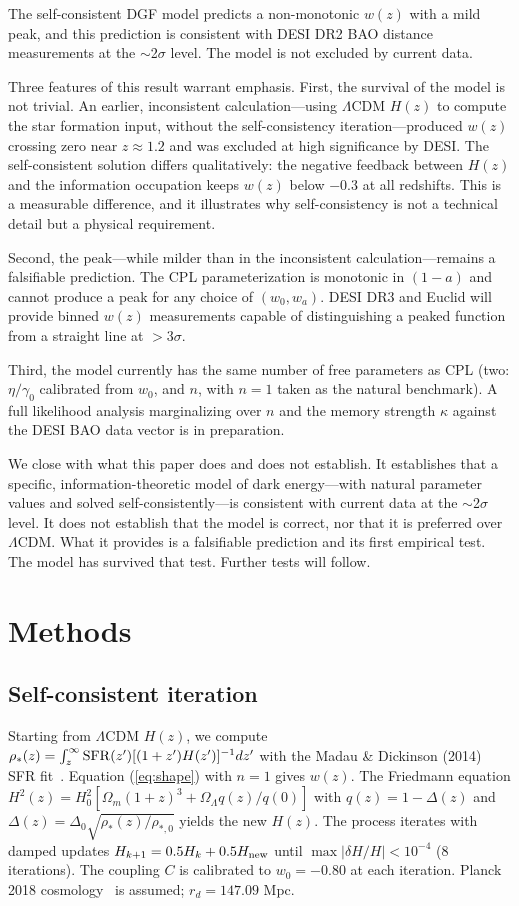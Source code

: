 \documentclass[12pt,a4paper]{article}
\begin{document}
The self-consistent DGF model predicts a non-monotonic $w(z)$ with a mild peak, and this prediction is consistent with DESI DR2 BAO distance measurements at the $\sim$2$\sigma$ level. The model is not excluded by current data.

Three features of this result warrant emphasis. First, the survival of the model is not trivial. An earlier, inconsistent calculation---using $\Lambda$CDM $H(z)$ to compute the star formation input, without the self-consistency iteration---produced $w(z)$ crossing zero near $z\approx1.2$ and was excluded at high significance by DESI. The self-consistent solution differs qualitatively: the negative feedback between $H(z)$ and the information occupation keeps $w(z)$ below $-0.3$ at all redshifts. This is a measurable difference, and it illustrates why self-consistency is not a technical detail but a physical requirement.

Second, the peak---while milder than in the inconsistent calculation---remains a falsifiable prediction. The CPL parameterization is monotonic in $(1-a)$ and cannot produce a peak for any choice of $(w_0,w_a)$. DESI DR3 and Euclid will provide binned $w(z)$ measurements capable of distinguishing a peaked function from a straight line at $>$3$\sigma$.

Third, the model currently has the same number of free parameters as CPL (two: $\eta/\gamma_0$ calibrated from $w_0$, and $n$, with $n=1$ taken as the natural benchmark). A full likelihood analysis marginalizing over $n$ and the memory strength $\kappa$ against the DESI BAO data vector is in preparation.

We close with what this paper does and does not establish. It establishes that a specific, information-theoretic model of dark energy---with natural parameter values and solved self-consistently---is consistent with current data at the $\sim$2$\sigma$ level. It does not establish that the model is correct, nor that it is preferred over $\Lambda$CDM. What it provides is a falsifiable prediction and its first empirical test. The model has survived that test. Further tests will follow.

\section*{Methods}

\subsection*{Self-consistent iteration}
Starting from $\Lambda$CDM $H(z)$, we compute $\rho_*(z)=\int_z^\infty{\rm SFR}(z')[(1+z')H(z')]^{-1}dz'$ with the Madau \& Dickinson (2014) SFR fit~\cite{madau2014}. Equation (\ref{eq:shape}) with $n=1$ gives $w(z)$. The Friedmann equation $H^2(z)=H_0^2[\Omega_m(1+z)^3+\Omega_\Lambda q(z)/q(0)]$ with $q(z)=1-\Delta(z)$ and $\Delta(z)=\Delta_0\sqrt{\rho_*(z)/\rho_{*,0}}$ yields the new $H(z)$. The process iterates with damped updates $H_{k+1}=0.5H_k+0.5H_{\rm new}$ until $\max|\delta H/H|<10^{-4}$ (8 iterations). The coupling $C$ is calibrated to $w_0=-0.80$ at each iteration. Planck 2018 cosmology~\cite{planck2018} is assumed; $r_d=147.09$ Mpc.
\end{document}
